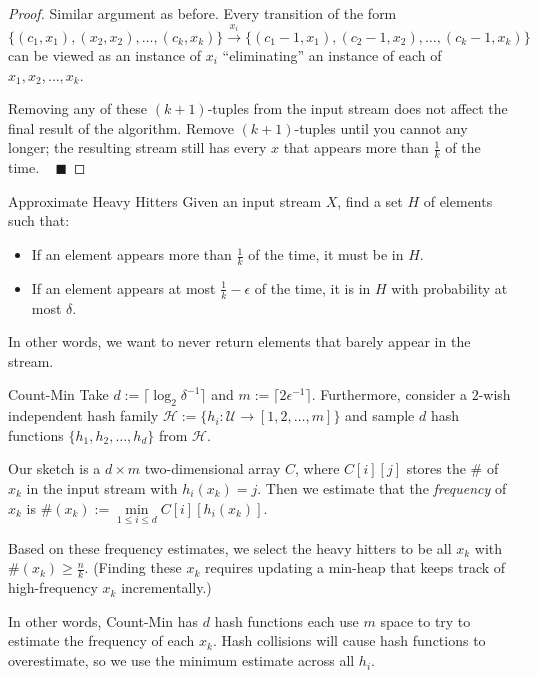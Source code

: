 \begin{proof}
    Similar argument as before.  Every transition of the form
    \[ \{(c_1, x_1), (x_2, x_2), \dots, (c_k, x_k)\} \stackrel{x_i}{\longrightarrow} \{(c_1 - 1, x_1), (c_2 - 1, x_2), \dots, (c_k - 1, x_k)\} \]
    can be viewed as an instance of $x_i$ ``eliminating'' an instance of each of $x_1, x_2, \dots, x_k$.

    Removing any of these $(k + 1)$-tuples from the input stream does not affect the final result of the algorithm.  Remove $(k + 1)$-tuples until you cannot any longer; the resulting stream still has every $x$ that appears more than $\frac{1}{k}$ of the time. ~ $\blacksquare$
\end{proof}

\begin{problem}{Approximate Heavy Hitters}
    Given an input stream $X$, find a set $H$ of elements such that:
    \begin{itemize}
        \item If an element appears more than $\frac{1}{k}$ of the time, it must be in $H$.
        \item If an element appears at most $\frac{1}{k} - \epsilon$ of the time, it is in $H$ with probability at most $\delta$.
    \end{itemize}
    In other words, we want to never return elements that barely appear in the stream.
\end{problem}

\begin{solution}{Count-Min}
    Take $d := \lceil \log_2 \delta^{-1} \rceil$ and $m := \lceil 2 \epsilon^{-1} \rceil$.  Furthermore, consider a $2$-wish independent hash family $\mathcal{H} := \{ h_i : \mathcal{U} \to [1, 2, \dots, m]\}$ and sample $d$ hash functions $\{h_1, h_2, \dots, h_d\}$ from $\mathcal{H}$.

    Our sketch is a $d \times m$ two-dimensional array $C$, where $C[i][j]$ stores the \# of $x_k$ in the input stream with $h_i(x_k) = j$.  Then we estimate that the \emph{frequency} of $x_k$ is $\#(x_k) := \underset{1 \leq i \leq d}{\min} C[i][h_i(x_k)]$.

    Based on these frequency estimates, we select the heavy hitters to be all $x_k$ with $\#(x_k) \geq \frac{n}{k}$.  (Finding these $x_k$ requires updating a min-heap that keeps track of high-frequency $x_k$ incrementally.)
\end{solution}

In other words, Count-Min has $d$ hash functions each use $m$ space to try to estimate the frequency of each $x_k$.  Hash collisions will cause hash functions to overestimate, so we use the minimum estimate across all $h_i$.

